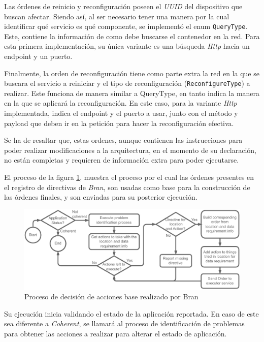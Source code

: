 Las órdenes de reinicio y reconfiguración poseen el \textit{UUID} del dispositivo que buscan afectar. Siendo así, al ser necesario tener una manera por la cual identificar qué servicio es qué componente, se implementó el enum \texttt{QueryType}. Este, contiene la información de como debe buscarse el contenedor en la red. Para esta primera implementación, su única variante es una búsqueda \textit{Http} hacia un endpoint y un puerto.

Finalmente, la orden de reconfiguración tiene como parte extra la red en la que se buscara el servicio a reiniciar y el tipo de reconfiguración (\texttt{ReconfigureType}) a realizar. Este funciona de manera similar a QueryType, en tanto indica la manera en la que se aplicará la reconfiguración. En este caso, para la variante \textit{Http} implementada, indica el endpoint y el puerto a usar, junto con el método y payload que deben ir en la petición para hacer la reconfiguración efectiva.

Se ha de resaltar que, estas ordenes, aunque contienen las instrucciones para poder realizar modificaciones a la arquitectura, en el momento de su declaración, no están completas y requieren de información extra para poder ejecutarse.

El proceso de la figura \ref{fig:BranExecution}, muestra el proceso por el cual las órdenes presentes en el registro de directivas de \textit{Bran}, son usadas como base para la construcción de las órdenes finales, y son enviadas para su posterior ejecución.

\begin{figure}[ht]
    \centering
    \caption{Proceso de decisión de acciones base realizado por Bran}
    \label{fig:BranExecution}
    \includegraphics[width=0.9\linewidth]{images/BranProcessExecuter.pdf}
\end{figure}

Su ejecución inicia validando el estado de la aplicación reportada. En caso de este sea diferente a \textit{Coherent}, se llamará al proceso de identificación de problemas para obtener las acciones a realizar para alterar el estado de aplicación.

